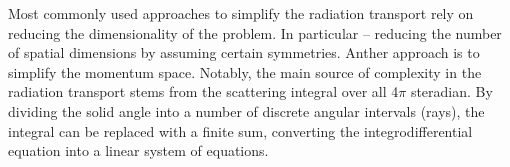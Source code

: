 Most commonly used approaches to simplify the radiation transport rely 
on reducing the dimensionality of the problem. In particular -- 
reducing the number of spatial dimensions by assuming certain symmetries.
Anther approach is to simplify the momentum space. 
%
%
Notably, the main source of complexity in the radiation transport stems from the scattering 
integral over all 4$\pi$ steradian.
By dividing the solid angle into a number of discrete angular intervals (rays), the 
integral can be replaced with a finite sum, converting the integrodifferential equation 
into a linear system of equations. %
%
